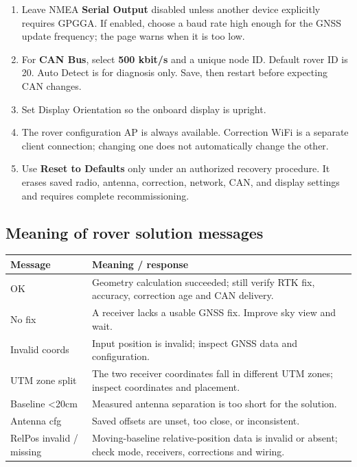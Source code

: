 \documentclass[
  10pt,
  letterpaper,
  openany]{report}
\newcounter{none} %
\providecommand{\tightlist}{%
  \setlength{\itemsep}{0pt}\setlength{\parskip}{0pt}}
\begin{document}
\begin{enumerate}
\tightlist
\item
  Leave NMEA \textbf{Serial Output} disabled unless another device
  explicitly requires GPGGA. If enabled, choose a baud rate high enough
  for the GNSS update frequency; the page warns when it is too low.
\item
  For \textbf{CAN Bus}, select \textbf{500 kbit/s} and a unique node ID.
  Default rover ID is 20. Auto Detect is for diagnosis only. Save, then
  restart before expecting CAN changes.
\item
  Set Display Orientation so the onboard display is upright.
\item
  The rover configuration AP is always available. Correction WiFi is a
  separate client connection; changing one does not automatically change
  the other.
\item
  Use \textbf{Reset to Defaults} only under an authorized recovery
  procedure. It erases saved radio, antenna, correction, network, CAN,
  and display settings and requires complete recommissioning.
\end{enumerate}

\subsection{Meaning of rover solution
messages}\label{meaning-of-rover-solution-messages}

{\def\LTcaptype{none} %
\begin{longtable}[]{@{}
  >{\raggedright\arraybackslash}p{}
  >{\raggedright\arraybackslash}p{}@{}}
\toprule\noalign{}
\begin{minipage}[b]{\linewidth}\raggedright
Message
\end{minipage} & \begin{minipage}[b]{\linewidth}\raggedright
Meaning / response
\end{minipage} \\
\midrule\noalign{}
\endhead
\bottomrule\noalign{}
\endlastfoot
OK & Geometry calculation succeeded; still verify RTK fix, accuracy,
correction age and CAN delivery. \\
No fix & A receiver lacks a usable GNSS fix. Improve sky view and
wait. \\
Invalid coords & Input position is invalid; inspect GNSS data and
configuration. \\
UTM zone split & The two receiver coordinates fall in different UTM
zones; inspect coordinates and placement. \\
Baseline \textless20cm & Measured antenna separation is too short for
the solution. \\
Antenna cfg & Saved offsets are unset, too close, or inconsistent. \\
RelPos invalid / missing & Moving-baseline relative-position data is
invalid or absent; check mode, receivers, corrections and wiring. \\
\end{longtable}
}
\end{document}
